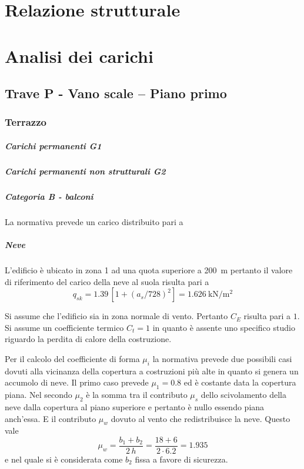 \chapter{Relazione strutturale}
\chapter{Analisi dei carichi}
\section{Trave P - Vano scale -- Piano primo}
\subsection{Terrazzo}
\paragraph*{Carichi permanenti G1}
\paragraph*{Carichi permanenti non strutturali G2}
\paragraph*{Categoria B - balconi} La normativa prevede un carico distribuito pari a 
\paragraph*{Neve}
L'edificio è ubicato in zona 1 ad una quota superiore a \SI{200}{\meter} pertanto il valore di riferimento del carico della neve al suola risulta pari a
\[
	q_{sk}=1.39 \, [1+(a_s/728)^2] = \SI{1.626}{\kilo\newton\per\square\meter}
\]

Si assume che l'edificio sia in zona normale di vento. Pertanto $C_E$ risulta pari a $1$.
Si assume un coefficiente termico $C_t = 1$ in quanto è assente uno specifico studio riguardo la perdita di calore della costruzione. 

Per il calcolo del coefficiente di forma $\mu_i$ la normativa prevede due possibili casi dovuti alla vicinanza della copertura a costruzioni più alte in quanto si genera un accumolo di neve.
Il primo caso prevede $\mu_1=0.8$ ed è costante data la copertura piana. Nel secondo $\mu_2$ è la somma tra il contributo $\mu_s$ dello scivolamento della neve dalla copertura al piano superiore e pertanto è nullo essendo piana anch'essa. 
E il contributo $\mu_w$ dovuto al vento che redistribuisce la neve. 
Questo vale 
\[\mu_w=\frac{b_1 + b_2}{2\,h}=\frac{18+6}{2\cdot6.2}=1.935\] e nel quale si è considerata come $b_2$ fissa a favore di sicurezza.

